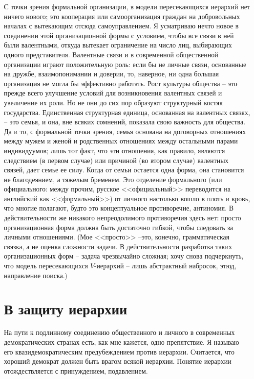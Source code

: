 \documentclass{book}
\begin{document}
С точки зрения формальной организации, в модели пересека­ющихся иерархий нет ничего нового; это кооперация или самоор­ганизация граждан на добровольных началах с вытекающим от­сюда самоуправлением. Я усматриваю нечто новое в соединении этой организационной формы с условием, чтобы все связи в ней были валентными, откуда вытекает ограничение на число лиц, выбирающих одного представителя. Валентные связи и в совре­менной общественной организации играют положительную роль:
если бы не личные связи, основанные на дружбе, взаимопонима­нии и доверии, то, наверное, ни одна большая организация не мог­ла бы эффективно работать. Рост культуры общества -- это преж­де всего улучшение условий для возникновения валентных свя­зей и увеличение их роли. Но не они до сих пор образуют струк­турный костяк государства. Единственная структурная единица, основанная на валентных связях, -- это семья, и она, вне всяких сомнений, показала свою важность для общества. Да и то, с фор­мальной точки зрения, семья основана на договорных отношениях между мужем и женой и родственных отношениях между осталь­ными парами индивидуумов; лишь тот факт, что эти отношения, как правило, являются следствием (в первом случае) или причи­ной (во втором случае) валентных связей, дает семье ее силу. Когда от семьи остается одна форма, она становится не благодея­нием, а тяжелым бременем. Это отделение формального  (или официального:  между прочим, русское <<официальный>> перево­дится на английский как <<формальный>>) от личного 
 настолько вошло в плоть и кровь, что многие полагают, будто это концеп­туальное противоречие, антиномия. В действительности же ника­кого непреодолимого противоречия здесь нет: просто организа­ционная форма должна быть достаточно гибкой, чтобы следо­вать за личными отношениями. (Мое <<просто>> --это, конечно, грамматическая связка, а не оценка сложности задачи. В дейст­вительности разработка таких организационных форм -- задача чрезвычайно сложная; хочу снова подчеркнуть, что модель пересекающихся $V$-иерархий -- лишь абстрактный набросок, этюд, направление поиска.)



\section{В защиту иерархии}

На пути к подлинному соединению общественного и личного в современных демократических странах есть, как мне кажется, одно препятствие. Я называю его квазидемократическим преду­беждением против иерархии. Считается, что хороший демократ должен быть врагом всякой иерархии. Понятие иерархии отож­дествляется с принуждением, подавлением.
\end{document}
